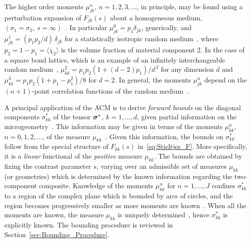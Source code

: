 \documentclass{cmslatex}
\newcommand\bsig{\mbox{\boldmath${\sigma}$}}
\begin{document}
The higher order moments $\mu_{jk}^n$, $n=1,2,3,\ldots$, in principle, may be
found using a perturbation
expansion of $F_{jk}(s)$ about a 
homogeneous medium, $(\sigma_1=\sigma_2, \ s=\infty)$~\cite{Golden:CMP-473,Bruno:JSP-365}. In
particular $\mu_{jk}^0=p_1\delta_{jk}$, generically, and $\mu_{jk}^1=(p_1p_2/d)\,\delta_{jk}$
for a statistically isotropic random
medium~\cite{Golden:CMP-473,Golden:IMA-97,Bruno:JSP-365}, where 
$p_2=1-p_1=\langle\chi_2\rangle$ is the volume fraction of material component 2. In
the case of a square bond lattice, which is an example of an
infinitely interchangeable random medium~\cite{Bruno:JSP-365},
$\mu_{kk}^2=p_1p_2(1+(d-2)p_1)/d^{\,2}$ for any dimension $d$ and
$\mu_{kk}^3=p_1p_2(1+p_1-p_1^2)/8$ for $d=2$. In general, the moments
$\mu_{jk}^n$ depend on the $(n+1)$-point correlation functions of the
random medium~\cite{Golden:CMP-473,Bruno:JSP-365}.




A principal application of the ACM is to derive \emph{forward bounds}
on the diagonal components $\sigma_{kk}^*$ of the tensor $\bsig^*$,
$k=1,\ldots,d$, given partial information on the
microgeometry~\cite{Bergman:PRL-1285,Milton:APL-300,Golden:CMP-473,Bergman:AP-78}. This   
information may be given in terms of the moments $\mu_{kk}^n$,
$n=0,1,2,\ldots$, of the measure
$\mu_{kk}$~\cite{Milton:JAP-5294,Golden:CMP-473}. Given this
information, the  
bounds on $\sigma_{kk}^*$ follow from the special structure of $F_{kk}(s)$
in~\eqref{eq:Stieltjes_F}. More specifically, it is a \emph{linear}
functional of the \emph{positive} measure $\mu_{kk}$.  The bounds are
obtained by fixing the contrast parameter $s$, varying over an
admissible set of measures $\mu_{kk}$ (or geometries) which is
determined by the known information regarding the two-component
composite.  Knowledge of the moments $\mu_{kk}^n$  for $n=1,\ldots,J$ confines
$\sigma_{kk}^*$ to a region of the complex plane which is bounded by arcs
of circles, and the region becomes progressively smaller as more
moments are known~\cite{Milton:JAP-5294,Golden:JMPS-333}. When 
all the moments are known, the measure $\mu_{kk}$ is uniquely
determined~\cite{Akhiezer:Book:1965}, hence  $\sigma_{kk}^*$ is explicitly
known. The bounding procedure is reviewed in
Section~\ref{sec:Bounding_Procedure}. 
\end{document}
